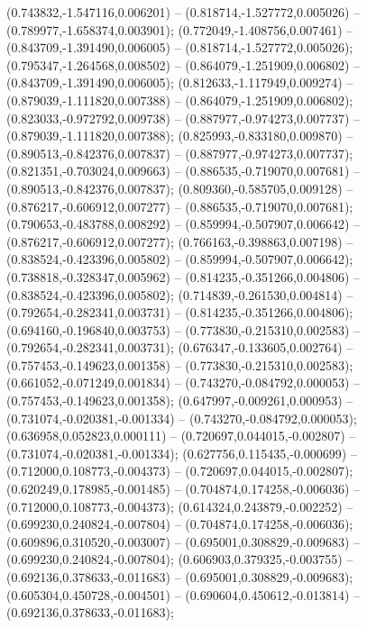  (0.743832,-1.547116,0.006201) -- (0.818714,-1.527772,0.005026) -- (0.789977,-1.658374,0.003901);
 (0.772049,-1.408756,0.007461) -- (0.843709,-1.391490,0.006005) -- (0.818714,-1.527772,0.005026);
 (0.795347,-1.264568,0.008502) -- (0.864079,-1.251909,0.006802) -- (0.843709,-1.391490,0.006005);
 (0.812633,-1.117949,0.009274) -- (0.879039,-1.111820,0.007388) -- (0.864079,-1.251909,0.006802);
 (0.823033,-0.972792,0.009738) -- (0.887977,-0.974273,0.007737) -- (0.879039,-1.111820,0.007388);
 (0.825993,-0.833180,0.009870) -- (0.890513,-0.842376,0.007837) -- (0.887977,-0.974273,0.007737);
 (0.821351,-0.703024,0.009663) -- (0.886535,-0.719070,0.007681) -- (0.890513,-0.842376,0.007837);
 (0.809360,-0.585705,0.009128) -- (0.876217,-0.606912,0.007277) -- (0.886535,-0.719070,0.007681);
 (0.790653,-0.483788,0.008292) -- (0.859994,-0.507907,0.006642) -- (0.876217,-0.606912,0.007277);
 (0.766163,-0.398863,0.007198) -- (0.838524,-0.423396,0.005802) -- (0.859994,-0.507907,0.006642);
 (0.738818,-0.328347,0.005962) -- (0.814235,-0.351266,0.004806) -- (0.838524,-0.423396,0.005802);
 (0.714839,-0.261530,0.004814) -- (0.792654,-0.282341,0.003731) -- (0.814235,-0.351266,0.004806);
 (0.694160,-0.196840,0.003753) -- (0.773830,-0.215310,0.002583) -- (0.792654,-0.282341,0.003731);
 (0.676347,-0.133605,0.002764) -- (0.757453,-0.149623,0.001358) -- (0.773830,-0.215310,0.002583);
 (0.661052,-0.071249,0.001834) -- (0.743270,-0.084792,0.000053) -- (0.757453,-0.149623,0.001358);
 (0.647997,-0.009261,0.000953) -- (0.731074,-0.020381,-0.001334) -- (0.743270,-0.084792,0.000053);
 (0.636958,0.052823,0.000111) -- (0.720697,0.044015,-0.002807) -- (0.731074,-0.020381,-0.001334);
 (0.627756,0.115435,-0.000699) -- (0.712000,0.108773,-0.004373) -- (0.720697,0.044015,-0.002807);
 (0.620249,0.178985,-0.001485) -- (0.704874,0.174258,-0.006036) -- (0.712000,0.108773,-0.004373);
 (0.614324,0.243879,-0.002252) -- (0.699230,0.240824,-0.007804) -- (0.704874,0.174258,-0.006036);
 (0.609896,0.310520,-0.003007) -- (0.695001,0.308829,-0.009683) -- (0.699230,0.240824,-0.007804);
 (0.606903,0.379325,-0.003755) -- (0.692136,0.378633,-0.011683) -- (0.695001,0.308829,-0.009683);
 (0.605304,0.450728,-0.004501) -- (0.690604,0.450612,-0.013814) -- (0.692136,0.378633,-0.011683);
